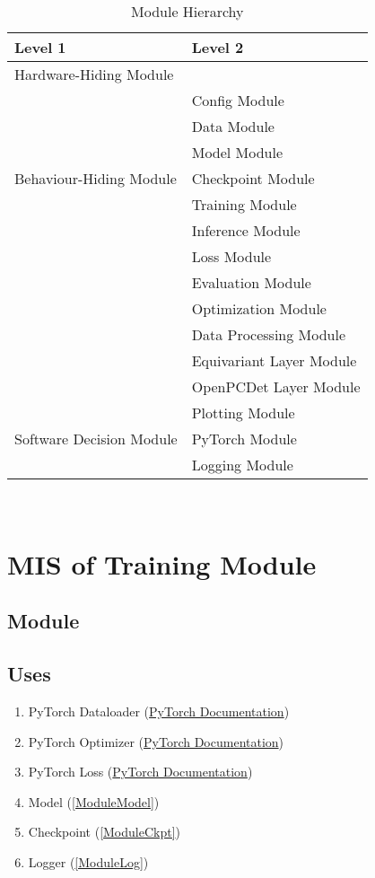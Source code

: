 \documentclass[12pt, titlepage]{article}
\begin{document}
\begin{table}[h!]
  \centering
  \begin{tabular}{p{} p{}}
  \toprule
  \textbf{Level 1} & \textbf{Level 2}\\
  \midrule
  
  {Hardware-Hiding Module} & ~ \\
  \midrule
  
  \multirow{7}{0.3\textwidth}{Behaviour-Hiding Module} 
  & Config Module\\
  & Data Module\\
  & Model Module\\
  & Checkpoint Module\\
  & Training Module\\
  & Inference Module\\
  & Loss Module\\ 
  & Evaluation Module\\
  & Optimization Module\\
  & Data Processing Module\\
  & Equivariant Layer Module\\
  & OpenPCDet Layer Module\\
  \midrule
  
  \multirow{3}{0.3\textwidth}{Software Decision Module}
  & Plotting Module\\
  & PyTorch Module\\
  & Logging Module\\
  \bottomrule
  
  \end{tabular}
  \caption{Module Hierarchy}
  \label{TblMH}
  \end{table}
\newpage
~\newpage

\section{MIS of Training Module} \label{ModuleTrain} 

\subsection{Module}



\subsection{Uses}
\begin{enumerate}
  \item PyTorch Dataloader (\href{https://pytorch.org/tutorials/beginner/basics/data_tutorial.html}{PyTorch Documentation})
  \item PyTorch Optimizer (\href{https://pytorch.org/docs/stable/optim.html}{PyTorch Documentation})
  \item PyTorch Loss (\href{https://pytorch.org/docs/stable/nn.html#loss-functions}{PyTorch Documentation})
  \item Model (\ref{ModuleModel})
  \item Checkpoint (\ref{ModuleCkpt})
  \item Logger (\ref{ModuleLog})
\end{enumerate}
\end{document}
